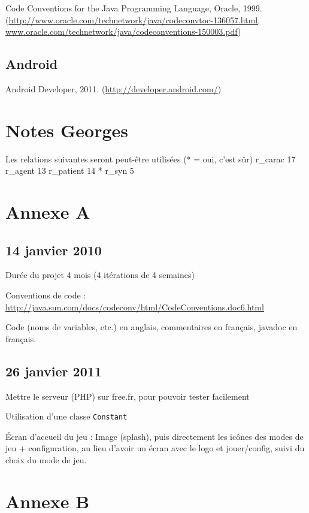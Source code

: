 \documentclass[a4paper,11pt,french]{article}
\begin{document}
Code Conventions for the Java Programming Language, Oracle, 1999. (\url{http://www.oracle.com/technetwork/java/codeconvtoc-136057.html, www.oracle.com/technetwork/java/codeconventions-150003.pdf})

\subsection{Android}

Android Developer, 2011. (\url{http://developer.android.com/})




\section{Notes Georges}
Les relations suivantes seront peut-être utilisées (* = oui, c'est sûr)
r\_carac 17
r\_agent 13
r\_patient 14
* r\_syn 5

\newpage

\appendix

\section{Annexe A}


\subsection{14 janvier 2010}


Durée du projet 4 mois (4 itérations de 4 semaines)

Conventions de code : \url{http://java.sun.com/docs/codeconv/html/CodeConventions.doc6.html}

Code (noms de variables, etc.) en anglais, commentaires en français, javadoc en français.

\subsection{26 janvier 2011}
Mettre le serveur (PHP) sur free.fr, pour pouvoir tester facilement

Utilisation d'une classe \verb!Constant!

Écran d'accueil du jeu : Image (splash), puis directement les icônes des modes de jeu + configuration, au lieu d'avoir un écran avec le logo et jouer/config, suivi du choix du mode de jeu.

\section{Annexe B}
\end{document}
